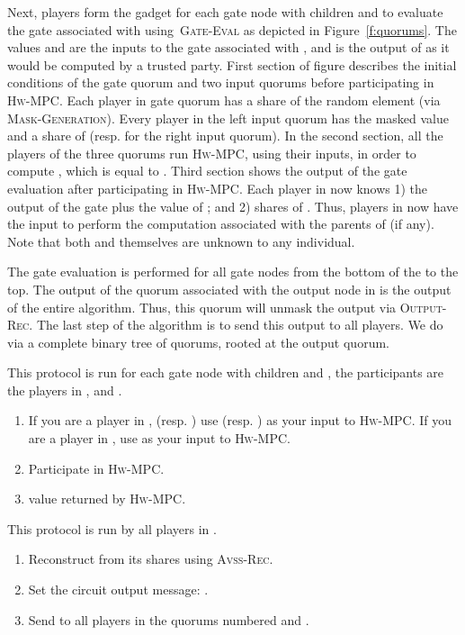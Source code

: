 \documentclass[10pt]{llncs}
\newcommand{\vssRec}{\textsc{Avss-Rec}\xspace}
\newcommand{\hw}{\textsc{Hw-MPC}\xspace}
\newcommand{\gm}{\textsc{Mask-Generation}\xspace}
\newcommand{\gcomp}{\textsc{Gate-Eval}\xspace}
\newcommand{\outrec}{\textsc{Output-Rec}\xspace}
\begin{document}
Next, players form the gadget for each gate node  with children
 and  to evaluate the gate associated with 
using~\gcomp as depicted in Figure~\ref{f:quorums}. The values
 and  are the inputs to the gate
associated with , and  is the output of  as it would be
computed by a trusted party. First section of figure describes the
initial conditions of the gate quorum and two input quorums before
participating in \hw. Each player in gate quorum  has a share of
the random element  (via \gm). Every player in the left input
quorum  has the masked value  and a share of 
(resp. for the right input quorum). In the second section, all the
players of the three quorums run \hw, using their inputs, in order to
compute , which is equal to . Third section shows
the output of the gate evaluation after participating in \hw. Each
player in  now knows 1) the output of the gate plus
the value of ; and 2) shares of . Thus, players in
 now have the input to perform the computation associated with
the parents of  (if any). Note that both  and 
themselves are unknown to any individual.
 
   
The gate evaluation is performed for all gate nodes from the bottom of
the  to the top. The output of the quorum associated with the
output node in  is the output of the entire algorithm. Thus, this
quorum will unmask the output via \outrec. The last step of the
algorithm is to send this output to all players. We do via
a complete binary tree of quorums, rooted at the output quorum.


\begin{algorithm} 
\caption{\gcomp}\label{alg:gate}
This protocol is run for each gate node  with children  and , the 
participants are the players in ,  and .

\begin{enumerate}
\item If you are a player in  , (resp. ) use   (resp. ) as your input to \hw. If you are a player in , use  as your input to \hw.
\item Participate in \hw.
\item  value returned by \hw.
\end{enumerate}
\end{algorithm}

\begin{algorithm} 
\caption{\outrec}\label{alg:root}
This protocol is run by all players in .
\begin{enumerate}
\item Reconstruct  from its shares using \vssRec. 
\item Set the circuit output message: .
\item Send  to all players in the quorums numbered  and .
\end{enumerate}
\end{algorithm}
\end{document}
